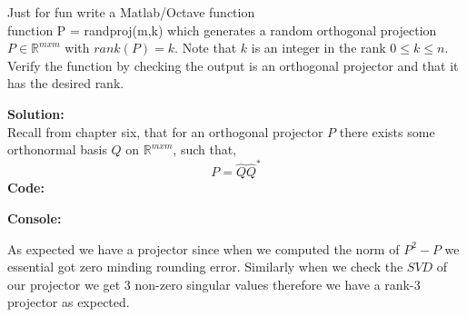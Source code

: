 \documentclass[12pt]{article}
\makeatletter
\theoremstyle{homework}
\newenvironment{exercise}[1]
{\def\@currentlabel{#1}\exercisecore}
{\endexercisecore}
\newcommand{\localhead}[1]{\par\smallskip\noindent\textbf{#1}\nobreak\\}%
\newcommand\solution{\localhead{Solution:}}
\newcommand{\Reals}{\ensuremath{\mathbb R}}
\let\RR\Reals
\makeatother
\begin{document}
\begin{exercise}{P13} Just for fun write a Matlab/Octave function\\
  function P = randproj(m,k)
  which generates a random orthogonal projection $P \in \RR^{mxm}$ with $rank(P) = k$. Note that 
  $k$ is an integer in the rank $0\le k \le n$. Verify the function by checking the output is an orthogonal projector 
  and that it has the desired rank. \\
  \solution Recall from chapter six, that for an orthogonal projector $P$ there exists some orthonormal basis $Q$ on $\RR^{mxm}$, such that,
  \begin{equation*}
    P = \hat{Q}\hat{Q}^*
  \end{equation*}
  \textbf{Code:}
  \begin{center}
    
    \end{center} 
  \textbf{Console:}
  \begin{center}
    
    \end{center} 
    As expected we have a projector since when we computed the 
    norm of $P^2 - P$ we essential got zero minding rounding error. Similarly when we 
    check the $SVD$ of our projector we get 3 non-zero singular values therefore we have 
    a rank-3 projector as expected. 
\end{exercise}
\vspace{1in}
\end{document}
